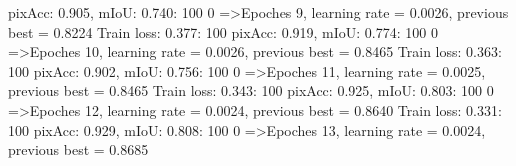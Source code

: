 pixAcc: 0.905, mIoU: 0.740: 100%
  0%
=>Epoches 9, learning rate = 0.0026,                 previous best = 0.8224
Train loss: 0.377: 100%
pixAcc: 0.919, mIoU: 0.774: 100%
  0%
=>Epoches 10, learning rate = 0.0026,                 previous best = 0.8465
Train loss: 0.363: 100%
pixAcc: 0.902, mIoU: 0.756: 100%
  0%
=>Epoches 11, learning rate = 0.0025,                 previous best = 0.8465
Train loss: 0.343: 100%
pixAcc: 0.925, mIoU: 0.803: 100%
  0%
=>Epoches 12, learning rate = 0.0024,                 previous best = 0.8640
Train loss: 0.331: 100%
pixAcc: 0.929, mIoU: 0.808: 100%
  0%
=>Epoches 13, learning rate = 0.0024,                 previous best = 0.8685
